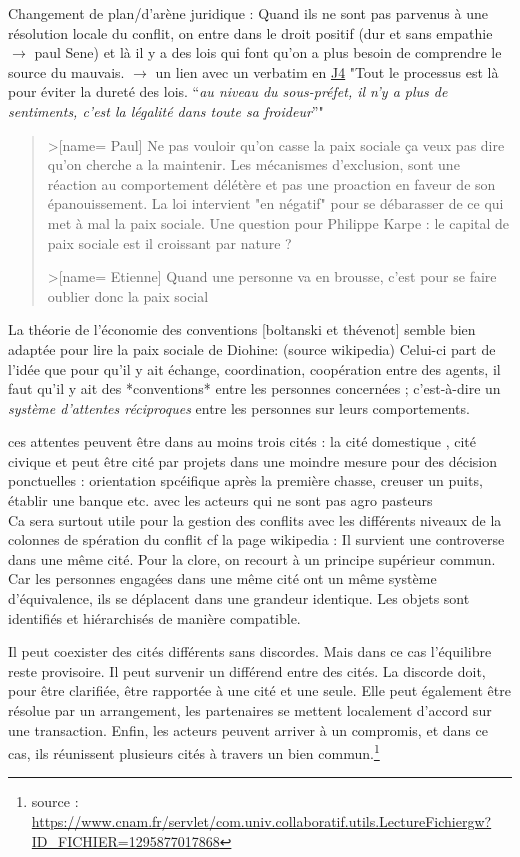 Changement de plan/d'arène juridique : Quand ils ne sont pas parvenus à une résolution locale du conflit, on entre dans le droit positif (dur et sans empathie $\longrightarrow$ paul Sene) et là il y a des lois qui font qu'on a plus besoin de comprendre le source du mauvais. $\longrightarrow$ un lien avec un verbatim en \href{https://hackmd.openmole.org/qhPAjsJGRbiOQYIItbwPww#J4---21-octobre}{J4} "Tout le processus est là pour éviter la dureté des lois. “\textit{au niveau du sous-préfet, il n’y a plus de sentiments, c’est la légalité dans toute sa froideur}”"

\begin{quote}
  >[name= Paul] Ne pas vouloir qu'on casse la paix sociale ça veux pas dire qu'on cherche a la maintenir. Les mécanismes d'exclusion, sont une réaction au comportement délétère et pas une proaction en faveur de son épanouissement. La loi intervient "en négatif" pour se débarasser de ce qui met à mal la paix sociale. Une question pour Philippe Karpe : le capital de paix sociale est il croissant par nature ?

  >[name= Etienne] Quand une personne va en brousse, c'est pour se faire oublier donc la paix social
\end{quote}

La théorie de l'économie des conventions [boltanski et thévenot]  semble bien adaptée pour lire la paix sociale de Diohine: (source wikipedia) Celui-ci part de l'idée que pour qu'il y ait échange, coordination, coopération entre des agents, il faut qu'il y ait des *conventions* entre les personnes concernées ; c’est-à-dire un \textit{système d'attentes réciproques} entre les personnes sur leurs comportements.

ces attentes peuvent être dans au moins trois cités : la cité domestique , cité civique et peut être cité par projets dans une moindre mesure pour des décision ponctuelles : orientation spcéifique après la première chasse, creuser un puits, établir une banque etc. avec les acteurs qui ne sont pas agro pasteurs\\
Ca sera surtout utile pour la gestion des conflits avec les différents niveaux de la colonnes de spération du conflit  cf la page wikipedia : Il survient une controverse dans une même cité. Pour la clore, on recourt à un principe supérieur commun. Car les personnes engagées dans une même cité ont un même système d'équivalence, ils se déplacent dans une grandeur identique. Les objets sont identifiés et hiérarchisés de manière compatible.

Il peut coexister des cités différents sans discordes. Mais dans ce cas l'équilibre reste provisoire. Il peut survenir un différend entre des cités. La discorde doit, pour être clarifiée, être rapportée à une cité et une seule. Elle peut également être résolue par un arrangement, les partenaires se mettent localement d'accord sur une transaction. Enfin, les acteurs peuvent arriver à un compromis, et dans ce cas, ils réunissent plusieurs cités à travers un bien commun.\footnote{source : \url{ https://www.cnam.fr/servlet/com.univ.collaboratif.utils.LectureFichiergw?ID_FICHIER=1295877017868}}
